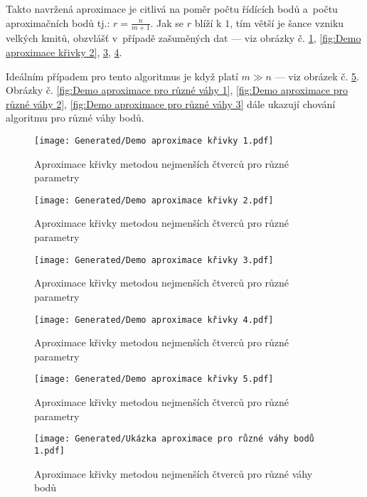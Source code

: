 Takto navržená aproximace je citlivá na poměr počtu řídících bodů a~počtu
aproximačních bodů tj.: $r = \frac{n}{m + 1}$. Jak se $r$ blíží k $1$, tím větší je šance vzniku velkých kmitů, obzvlášť v~případě zašuměných dat --- viz
obrázky č. \ref{fig:Demo aproximace křivky 1}, \ref{fig:Demo aproximace křivky
    2}, \ref{fig:Demo aproximace křivky 3}, \ref{fig:Demo aproximace křivky 4}.\par
Ideálním případem pro tento algoritmus je když platí $m \gg n$ --- viz obrázek č.
\ref{fig:Demo aproximace křivky 5}. Obrázky č. \ref{fig:Demo aproximace pro
    různé váhy 1}, \ref{fig:Demo aproximace pro různé váhy 2}, \ref{fig:Demo
    aproximace pro různé váhy 3} dále ukazují chování algoritmu pro různé váhy
bodů.
\begin{imagepage}
    \begin{figure}[H]
        \centering
        \texttt{[image: Generated/Demo aproximace křivky 1.pdf]}
        \caption{Aproximace křivky metodou nejmenších čtverců pro různé parametry}
        \label{fig:Demo aproximace křivky 1}
    \end{figure}
    \begin{figure}[H]
        \centering
        \texttt{[image: Generated/Demo aproximace křivky 2.pdf]}
        \caption{Aproximace křivky metodou nejmenších čtverců pro různé parametry}
        \label{fig:Demo aproximace křivky 2}
    \end{figure}
\end{imagepage}
\begin{imagepage}
    \begin{figure}[H]
        \centering
        \texttt{[image: Generated/Demo aproximace křivky 3.pdf]}
        \caption{Aproximace křivky metodou nejmenších čtverců pro různé parametry}
        \label{fig:Demo aproximace křivky 3}
    \end{figure}
    \begin{figure}[H]
        \centering
        \texttt{[image: Generated/Demo aproximace křivky 4.pdf]}
        \caption{Aproximace křivky metodou nejmenších čtverců pro různé parametry}
        \label{fig:Demo aproximace křivky 4}
    \end{figure}
\end{imagepage}
\begin{imagepage}
    \begin{figure}[H]
        \centering
        \texttt{[image: Generated/Demo aproximace křivky 5.pdf]}
        \caption{Aproximace křivky metodou nejmenších čtverců pro různé parametry}
        \label{fig:Demo aproximace křivky 5}
    \end{figure}
    \begin{figure}[H]
        \centering
        \texttt{[image: Generated/Ukázka aproximace pro různé váhy bodů 1.pdf]}
        \caption{Aproximace křivky metodou nejmenších čtverců pro různé váhy bodů}
        \label{fig:Demo aproximace pro různé váhy 1}
    \end{figure}
\end{imagepage}

